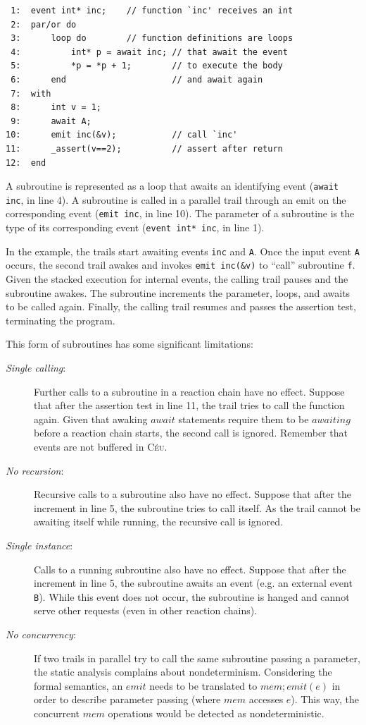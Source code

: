 \documentclass[preprint]{sigplanconf}
\newcommand{\CEU}{\textsc{C\'{e}u}\xspace}
\newcommand{\code}[1] {{\small{\texttt{#1}}}}
\newcommand{\1}{\;}
\newcommand{\2}{\;\;}
\newcommand{\3}{\;\;\;}
\newcommand{\5}{\;\;\;\;\;}
\begin{document}
{\small
\begin{verbatim}
 1:  event int* inc;    // function `inc' receives an int
 2:  par/or do
 3:      loop do        // function definitions are loops
 4:          int* p = await inc; // that await the event
 5:          *p = *p + 1;        // to execute the body
 6:      end                     // and await again
 7:  with
 8:      int v = 1;
 9:      await A;
10:      emit inc(&v);           // call `inc'
11:      _assert(v==2);          // assert after return
12:  end
\end{verbatim}
}

A subroutine is represented as a loop that awaits an identifying event 
(\code{await inc}, in line 4).
A subroutine is called in a parallel trail through an emit on the corresponding 
event (\code{emit inc}, in line 10).
The parameter of a subroutine is the type of its corresponding event 
(\code{event int* inc}, in line 1).

In the example, the trails start awaiting events \code{inc} and \code{A}.
Once the input event \code{A} occurs, the second trail awakes and invokes 
\code{emit~inc(\&v)} to ``call'' subroutine \code{f}.
Given the stacked execution for internal events, the calling trail pauses and 
the subroutine awakes.
The subroutine increments the parameter, loops, and awaits to be called again.
Finally, the calling trail resumes and passes the assertion test, terminating 
the program.

This form of subroutines has some significant limitations:

\begin{description}
\item[\emph{Single calling}:] Further calls to a subroutine in a reaction chain 
have no effect.
Suppose that after the assertion test in line 11, the trail tries to call the 
function again.
Given that awaking $await$ statements require them to be $awaiting$ before a 
reaction chain starts, the second call is ignored.
Remember that events are not buffered in \CEU.

\item[\emph{No recursion}:] Recursive calls to a subroutine also have no 
effect.
Suppose that after the increment in line 5, the subroutine tries to call 
itself.
As the trail cannot be awaiting itself while running, the recursive call is 
ignored.

\item[\emph{Single instance}:] Calls to a running subroutine also have no 
effect.
Suppose that after the increment in line 5, the subroutine awaits an event 
(e.g. an external event \code{B}).
While this event does not occur, the subroutine is hanged and cannot serve 
other requests (even in other reaction chains).

\item[\emph{No concurrency}:] If two trails in parallel try to call the same 
subroutine passing a parameter, the static analysis complains about 
nondeterminism.
Considering the formal semantics, an $emit$ needs to be translated to 
$mem;emit(e)$ in order to describe parameter passing (where $mem$ accesses 
$e$).
This way, the concurrent $mem$ operations would be detected as 
nondeterministic.
\end{description}
\end{document}
